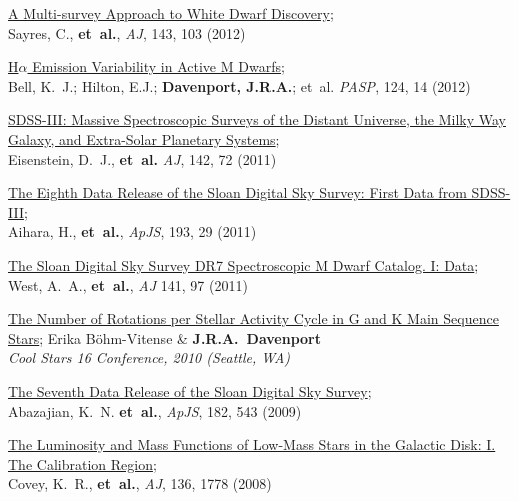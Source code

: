 \documentclass{article}
\begin{document}
\begin{llist}
\begin{etaremune}[leftmargin=10pt]
\item {\sc \href{http://adsabs.harvard.edu/abs/2012AJ....143..103S}{\color{NavyBlue}A Multi-survey Approach to White Dwarf Discovery}};\\
Sayres, C., {\bf et~al.}, {\em AJ}, 143, 103 (2012)

\item {\sc \href{http://adsabs.harvard.edu/abs/2012PASP..124...14B}{\color{NavyBlue}H$\alpha$ Emission Variability in Active M Dwarfs}};\\
Bell, K.~J.; Hilton, E.J.; {\bf Davenport, J.R.A.}; et~al. {\em PASP}, 124, 14 (2012)

\item {\sc \href{http://adsabs.harvard.edu/abs/2011AJ....142...72E}{\color{NavyBlue}SDSS-III: Massive Spectroscopic Surveys of the Distant Universe, the Milky Way Galaxy, and Extra-Solar Planetary Systems}};\\ 
Eisenstein, D.~J., {\bf et~al.} {\em AJ}, 142, 72 (2011)

\item {\sc \href{http://adsabs.harvard.edu/abs/2011ApJS..193...29A}{\color{NavyBlue}The Eighth Data Release of the Sloan Digital Sky Survey: First Data from SDSS-III}};\\
Aihara, H., {\bf et~al.}, {\em ApJS}, 193, 29 (2011)


\item {\sc \href{http://adsabs.harvard.edu/abs/2011AJ....141...97W}{\color{NavyBlue}The Sloan Digital Sky Survey DR7 Spectroscopic M Dwarf Catalog. I: Data}};\\
West, A.~A., {\bf et~al.}, {\em AJ} 141, 97 (2011)

\item{\sc\href{http://adsabs.harvard.edu/abs/2011ASPC..448.1077B}{\color{NavyBlue}The Number of Rotations per Stellar Activity Cycle in G and K Main Sequence Stars}};
Erika B\"ohm-Vitense \& {\bf J.R.A.~Davenport}\\
{\em Cool Stars 16 Conference, 2010 (Seattle, WA)}

\item {\sc \href{http://adsabs.harvard.edu/abs/2009ApJS..182..543A}{\color{NavyBlue}The Seventh Data Release of the Sloan Digital Sky Survey}};\\
Abazajian, K.~N. {\bf et~al.}, {\em ApJS}, 182, 543 (2009)

\item {\sc \href{http://adsabs.harvard.edu/abs/2008AJ....136.1778C}{\color{NavyBlue}The Luminosity and Mass Functions of Low-Mass Stars in the Galactic Disk: I. The Calibration Region}};\\
Covey, K.~R., {\bf et~al.}, {\em AJ}, 136, 1778 (2008)


\end{etaremune}
\end{llist}
\end{document}
